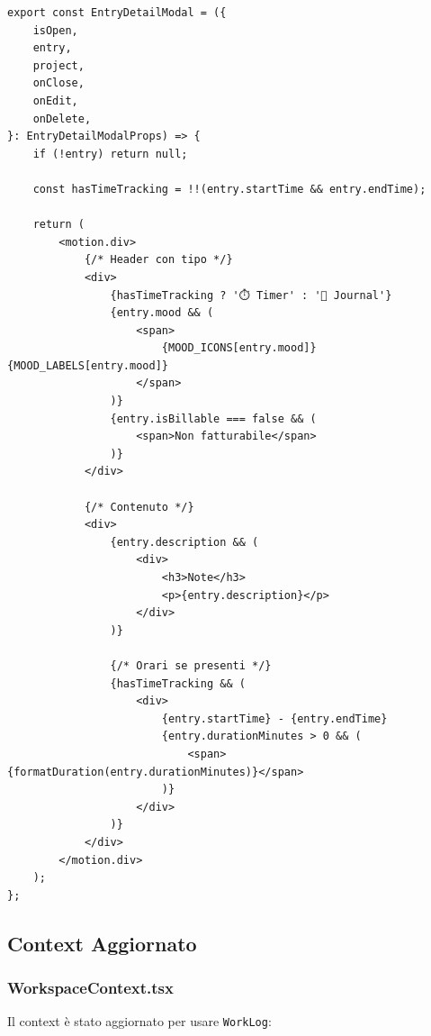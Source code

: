 \documentclass[11pt,a4paper]{article}
\begin{document}
\begin{lstlisting}[caption=EntryDetailModal Aggiornato]
export const EntryDetailModal = ({
    isOpen,
    entry,
    project,
    onClose,
    onEdit,
    onDelete,
}: EntryDetailModalProps) => {
    if (!entry) return null;
    
    const hasTimeTracking = !!(entry.startTime && entry.endTime);
    
    return (
        <motion.div>
            {/* Header con tipo */}
            <div>
                {hasTimeTracking ? '⏱️ Timer' : '📝 Journal'}
                {entry.mood && (
                    <span>
                        {MOOD_ICONS[entry.mood]} {MOOD_LABELS[entry.mood]}
                    </span>
                )}
                {entry.isBillable === false && (
                    <span>Non fatturabile</span>
                )}
            </div>
            
            {/* Contenuto */}
            <div>
                {entry.description && (
                    <div>
                        <h3>Note</h3>
                        <p>{entry.description}</p>
                    </div>
                )}
                
                {/* Orari se presenti */}
                {hasTimeTracking && (
                    <div>
                        {entry.startTime} - {entry.endTime}
                        {entry.durationMinutes > 0 && (
                            <span>{formatDuration(entry.durationMinutes)}</span>
                        )}
                    </div>
                )}
            </div>
        </motion.div>
    );
};
\end{lstlisting}

\subsection{Context Aggiornato}

\subsubsection{WorkspaceContext.tsx}

Il context è stato aggiornato per usare \texttt{WorkLog}:
\end{document}
